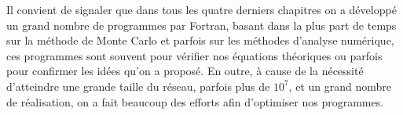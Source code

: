 Il convient de signaler que dans tous les quatre derniers chapitres on a développé un grand nombre de programmes par Fortran, basant dans la plus part de temps sur la méthode de Monte Carlo et parfois sur les méthodes d'analyse numérique, ces programmes sont souvent pour vérifier nos équations théoriques ou parfois pour confirmer les idées qu'on a proposé. En outre, à cause de la nécessité d'atteindre une grande taille du réseau, parfois plus de $10^7$, et un grand nombre de réalisation, on a fait beaucoup des efforts afin d'optimiser nos programmes.




 